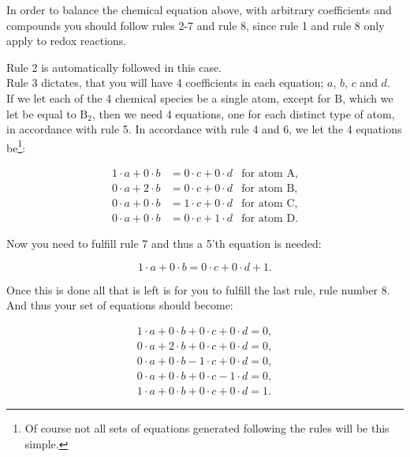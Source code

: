 \documentclass[a4paper]{article}
\begin{document}
In order to balance the chemical equation above, with arbitrary coefficients and compounds you should follow rules 2-7 and rule 8, since rule 1 and rule 8 only apply to redox reactions.

Rule 2 is automatically followed in this case.\\
Rule 3 dictates, that you will have 4 coefficients in each equation; $a$, $b$, $c$ and $d$.\\
If we let each of the 4 chemical species be a single atom, except for $\text{B}$, which we let be equal to $\text{B}_2$, then we need 4 equations, one for each distinct type of atom, in accordance with rule 5. In accordance with rule 4 and 6, we let the 4 equations be\footnote{Of course not all sets of equations generated following the rules will be this simple.}:

\begin{align*}
	1 \cdot a + 0 \cdot b &= 0 \cdot c + 0 \cdot d & \text{for atom $\text{A}$},\\
	0 \cdot a + 2 \cdot b &= 0 \cdot c + 0 \cdot d & \text{for atom $\text{B}$},\\
	0 \cdot a + 0 \cdot b &= 1 \cdot c + 0 \cdot d & \text{for atom $\text{C}$},\\
	0 \cdot a + 0 \cdot b &= 0 \cdot c + 1 \cdot d & \text{for atom $\text{D}$}.
\end{align*}

Now you need to fulfill rule 7 and thus a 5'th equation is needed:

$$1 \cdot a + 0 \cdot b = 0 \cdot c + 0 \cdot d + 1.$$

Once this is done all that is left is for you to fulfill the last rule, rule number 8. And thus your set of equations should become:

\begin{align*}
	1 \cdot a + 0 \cdot b + 0 \cdot c + 0 \cdot d = 0,\\
	0 \cdot a + 2 \cdot b + 0 \cdot c + 0 \cdot d = 0,\\
	0 \cdot a + 0 \cdot b - 1 \cdot c + 0 \cdot d = 0,\\
	0 \cdot a + 0 \cdot b + 0 \cdot c - 1 \cdot d = 0,\\
	1 \cdot a + 0 \cdot b + 0 \cdot c + 0 \cdot d = 1.
\end{align*}
\end{document}

